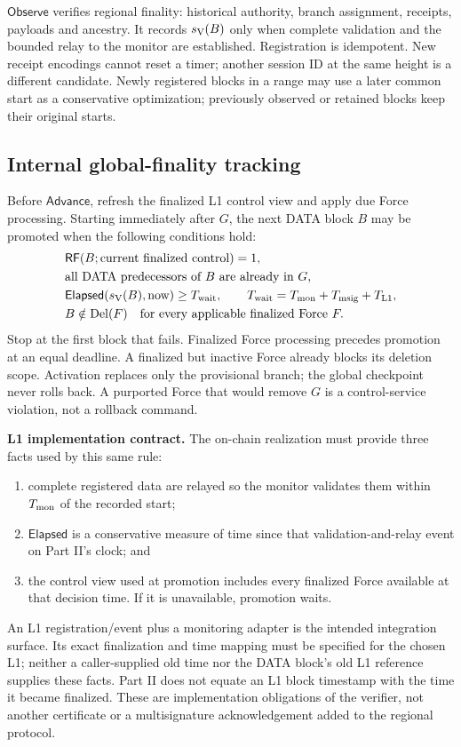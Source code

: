 \documentclass[11pt,a4paper]{article}
\newcommand{\api}[1]{\ensuremath{\mathsf{#1}}}
\newcommand{\RF}{\mathsf{RF}}
\newcommand{\Del}{\operatorname{Del}}
\newcommand{\Twait}{T_{\rm wait}}
\begin{document}
\api{Observe} verifies regional finality: historical authority, branch
assignment, receipts, payloads and ancestry. It records $s_{\rm V}(B)$
only when complete validation and the bounded relay to the monitor are
established. Registration is idempotent. New receipt encodings cannot
reset a timer; another session ID at the same height is a different
candidate. Newly registered blocks in a range may use a later common
start as a conservative optimization; previously observed or retained
blocks keep their original starts.

\subsection{Internal global-finality tracking}\label{sec:tracker}
Before \api{Advance}, refresh the finalized L1 control view and apply
due Force processing. Starting immediately after $G$, the next DATA
block $B$ may be promoted when the following conditions hold:
\[
\begin{aligned}
 &\RF(B;\text{current finalized control})=1,\\
 &\text{all DATA predecessors of }B\text{ are already in }G,\\
 &\api{Elapsed}(s_{\rm V}(B),\text{now})\ge\Twait,
   \qquad \Twait=T_{\rm mon}+T_{\rm msig}+T_{\rm L1},\\
 &B\notin\Del(F)\quad\text{for every applicable finalized Force }F.
\end{aligned}
\]
Stop at the first block that fails. Finalized Force processing precedes
promotion at an equal deadline. A finalized but inactive Force already
blocks its deletion scope. Activation replaces only the provisional
branch; the global checkpoint never rolls back. A purported Force that
would remove $G$ is a control-service violation, not a rollback command.

\textbf{L1 implementation contract.} The on-chain realization must
provide three facts used by this same rule:
\begin{enumerate}
\item complete registered data are relayed so the monitor validates
them within $T_{\rm mon}$ of the recorded start;
\item \api{Elapsed} is a conservative measure of time since that
validation-and-relay event on Part II's clock; and
\item the control view used at promotion includes every finalized Force
available at that decision time. If it is unavailable, promotion waits.
\end{enumerate}
An L1 registration/event plus a monitoring adapter is the intended
integration surface. Its exact finalization and time mapping must be
specified for the chosen L1; neither a caller-supplied old time nor the
DATA block's old L1 reference supplies these facts. Part II does not
equate an L1 block timestamp with the time it became finalized. These
are implementation obligations of the verifier, not another certificate
or a multisignature acknowledgement added to the regional protocol.
\end{document}
